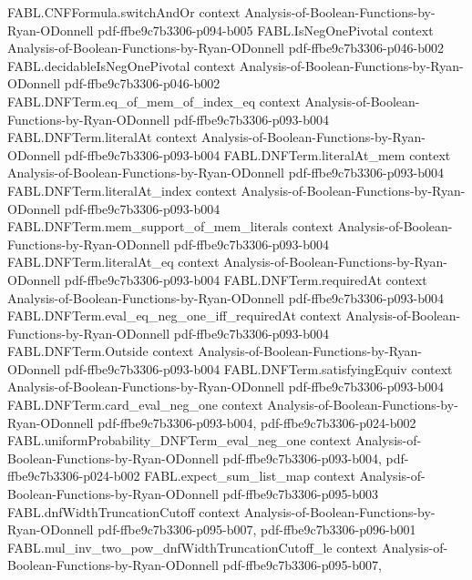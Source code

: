 \begin{theorem}
\proofstep
  {FABL.CNFFormula.switchAndOr}
  {context}
  {Analysis-of-Boolean-Functions-by-Ryan-ODonnell}
  {pdf-ffbe9c7b3306-p094-b005}
\proofstep
  {FABL.IsNegOnePivotal}
  {context}
  {Analysis-of-Boolean-Functions-by-Ryan-ODonnell}
  {pdf-ffbe9c7b3306-p046-b002}
\proofstep
  {FABL.decidableIsNegOnePivotal}
  {context}
  {Analysis-of-Boolean-Functions-by-Ryan-ODonnell}
  {pdf-ffbe9c7b3306-p046-b002}
\proofstep
  {FABL.DNFTerm.eq_of_mem_of_index_eq}
  {context}
  {Analysis-of-Boolean-Functions-by-Ryan-ODonnell}
  {pdf-ffbe9c7b3306-p093-b004}
\proofstep
  {FABL.DNFTerm.literalAt}
  {context}
  {Analysis-of-Boolean-Functions-by-Ryan-ODonnell}
  {pdf-ffbe9c7b3306-p093-b004}
\proofstep
  {FABL.DNFTerm.literalAt_mem}
  {context}
  {Analysis-of-Boolean-Functions-by-Ryan-ODonnell}
  {pdf-ffbe9c7b3306-p093-b004}
\proofstep
  {FABL.DNFTerm.literalAt_index}
  {context}
  {Analysis-of-Boolean-Functions-by-Ryan-ODonnell}
  {pdf-ffbe9c7b3306-p093-b004}
\proofstep
  {FABL.DNFTerm.mem_support_of_mem_literals}
  {context}
  {Analysis-of-Boolean-Functions-by-Ryan-ODonnell}
  {pdf-ffbe9c7b3306-p093-b004}
\proofstep
  {FABL.DNFTerm.literalAt_eq}
  {context}
  {Analysis-of-Boolean-Functions-by-Ryan-ODonnell}
  {pdf-ffbe9c7b3306-p093-b004}
\proofstep
  {FABL.DNFTerm.requiredAt}
  {context}
  {Analysis-of-Boolean-Functions-by-Ryan-ODonnell}
  {pdf-ffbe9c7b3306-p093-b004}
\proofstep
  {FABL.DNFTerm.eval_eq_neg_one_iff_requiredAt}
  {context}
  {Analysis-of-Boolean-Functions-by-Ryan-ODonnell}
  {pdf-ffbe9c7b3306-p093-b004}
\proofstep
  {FABL.DNFTerm.Outside}
  {context}
  {Analysis-of-Boolean-Functions-by-Ryan-ODonnell}
  {pdf-ffbe9c7b3306-p093-b004}
\proofstep
  {FABL.DNFTerm.satisfyingEquiv}
  {context}
  {Analysis-of-Boolean-Functions-by-Ryan-ODonnell}
  {pdf-ffbe9c7b3306-p093-b004}
\proofstep
  {FABL.DNFTerm.card_eval_neg_one}
  {context}
  {Analysis-of-Boolean-Functions-by-Ryan-ODonnell}
  {pdf-ffbe9c7b3306-p093-b004,
    pdf-ffbe9c7b3306-p024-b002}
\proofstep
  {FABL.uniformProbability_DNFTerm_eval_neg_one}
  {context}
  {Analysis-of-Boolean-Functions-by-Ryan-ODonnell}
  {pdf-ffbe9c7b3306-p093-b004,
    pdf-ffbe9c7b3306-p024-b002}
\proofstep
  {FABL.expect_sum_list_map}
  {context}
  {Analysis-of-Boolean-Functions-by-Ryan-ODonnell}
  {pdf-ffbe9c7b3306-p095-b003}
\proofstep
  {FABL.dnfWidthTruncationCutoff}
  {context}
  {Analysis-of-Boolean-Functions-by-Ryan-ODonnell}
  {pdf-ffbe9c7b3306-p095-b007,
    pdf-ffbe9c7b3306-p096-b001}
\proofstep
  {FABL.mul_inv_two_pow_dnfWidthTruncationCutoff_le}
  {context}
  {Analysis-of-Boolean-Functions-by-Ryan-ODonnell}
  {pdf-ffbe9c7b3306-p095-b007,
}
\end{theorem}
